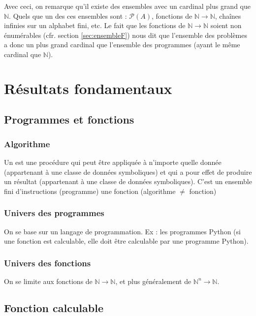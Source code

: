 \bigskip

Avec ceci, on remarque qu'il existe des ensembles avec un cardinal plus grand que $\mathbb{N}$. Quels que un des ces ensembles sont : $\mathcal{P}(A)$, fonctions de $\mathbb{N} \rightarrow \mathbb{N}$, chaînes infinies sur un alphabet fini, etc. Le fait que les fonctions de $\mathbb{N} \rightarrow \mathbb{N}$ soient non énumérables (cfr. section \ref{sec:ensembleF}) nous dit que l'ensemble des problèmes a donc un plus grand cardinal que l'ensemble des programmes (ayant le même cardinal que $\mathbb{N}$).

\chapter{Résultats fondamentaux}

\section{Programmes et fonctions}

\subsection{Algorithme}

Un  est une procédure qui peut être appliquée à n'importe quelle donnée (appartenant à une classe de données symboliques) et qui a pour effet de produire un résultat (appartenant à une classe de données symboliques). C'est un ensemble fini d'instructions (programme)  une fonction (algorithme $\neq$ fonction)

\subsection{Univers des programmes}

On se base sur un langage de programmation. Ex : les programmes Python (si une fonction est calculable, elle doit être calculable par une programme Python).

\subsection{Univers des fonctions}

On se limite aux fonctions de $\mathbb{N} \rightarrow \mathbb{N}$, et plus généralement de $\mathbb{N}^n \rightarrow \mathbb{N}$.

\section{Fonction calculable}

